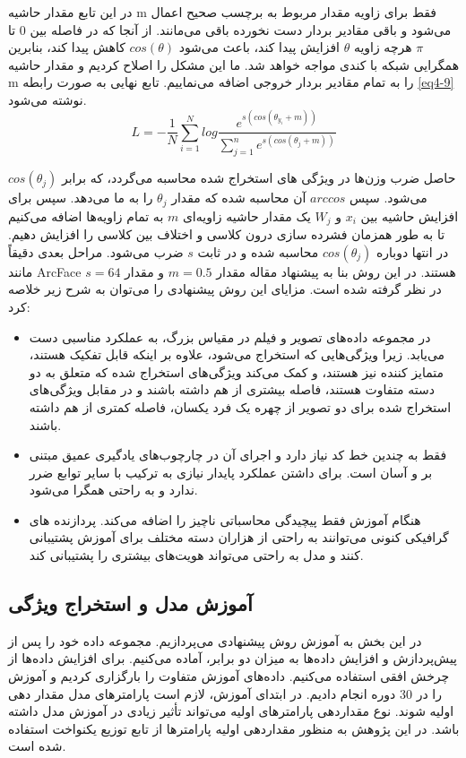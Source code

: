 \noindent 
در این تابع مقدار حاشیه m فقط برای زاویه مقدار مربوط به برچسب صحیح اعمال می‌شود و باقی مقادیر بردار دست نخورده باقی می‌مانند. از آنجا که در فاصله بین 0 تا $\pi$ هرچه زاویه $\theta$ افزایش پیدا کند، باعث می‌شود $cos(\theta)$ کاهش پیدا کند، بنابرین همگرایی شبکه با کندی مواجه خواهد شد. ما این مشکل را اصلاح کردیم و مقدار حاشیه m را به تمام مقادیر بردار خروجی اضافه می‌نماییم. تابع نهایی به صورت رابطه \ref{eq4-9} نوشته می‌شود.
\begin{equation}
L = - \frac{1}{N} \sum_{i=1}^{N} log \frac{e^{s(cos(\theta_{y_i}+m))}}{\sum_{j=1}^{n} e^{s(cos(\theta_j + m))}}
\label{eq4-9}
\end{equation}

\noindent 
حاصل ضرب وزن‌‌ها در ویژگی های استخراج شده محاسبه می‌گردد، که برابر $cos(\theta_j)$ می‌شود‌‌. سپس $arccos$ آن محاسبه شده که مقدار $\theta_j$ را به ما می‌دهد. سپس برای افزایش حاشیه بین $x_i$ و $W_j$ یک مقدار حاشیه زاویه‌ای $m$ به تمام زاویه‌ها اضافه می‌کنیم‌ تا به طور همزمان فشرده سازی درون کلاسی و اختلاف بین کلاسی را افزایش دهیم. در انتها دوباره $cos(\theta_j)$ محاسبه شده و در ثابت $s$ ضرب می‌شود.  مراحل بعدی دقیقاً مانند ArcFace هستند. در این روش بنا به پیشنهاد مقاله \cite{deng2019arcface} مقدار $m=0.5$ و مقدار $s=64$ در نظر گرفته شده است. مزایای این روش پیشنهادی را می‌توان به شرح زیر خلاصه کرد:

\begin{itemize}
 \item
در مجموعه داده‌های تصویر و فیلم در مقیاس بزرگ‌، به عملکرد مناسبی دست می‌یابد. زیرا ویژگی‌هایی که استخراج ‌می‌شود، علاوه بر اینکه قابل تفکیک  هستند، متمایز کننده  نیز هستند، و کمک می‌کند ویژگی‌های استخراج شده که متعلق به دو دسته متفاوت هستند، فاصله بیشتری از هم داشته باشند و در مقابل ویژگی‌های استخراج شده برای دو تصویر از چهره یک فرد یکسان، فاصله کمتری از هم داشته باشند.
 \item
فقط به چندین خط کد نیاز دارد و اجرای آن در چارچوب‌های  یادگیری عمیق مبتنی بر  و  آسان است. برای داشتن عملکرد پایدار نیازی به ترکیب با سایر توابع ضرر ندارد و به راحتی همگرا می‌شود.
 \item
هنگام آموزش فقط پیچیدگی محاسباتی ناچیز را اضافه می‌کند. پردازنده های گرافیکی کنونی می‌توانند به راحتی از هزاران دسته مختلف برای آموزش پشتیبانی کنند و مدل به راحتی می‌تواند هویت‌های بیشتری را پشتیبانی کند.
\end{itemize} 

\subsection{آموزش مدل و استخراج ویژگی}
در این بخش به آموزش روش پیشنهادی می‌پردازیم. مجموعه داده خود را پس از پیش‌پردازش و افزایش‌ داده‌ها  به میزان دو برابر، آماده می‌کنیم. برای افزایش داده‌ها از چرخش افقی  استفاده می‌کنیم. داده‌های آموزش متفاوت را بارگزاری کردیم و آموزش را در 30 دوره  انجام دادیم. در ابتدای آموزش، لازم است پارامترهای مدل مقدار دهی اولیه شوند. نوع مقداردهی پارامترهای اولیه می‌تواند تأثیر زیادی در آموزش مدل داشته باشد. در این پژوهش به منظور مقداردهی اولیه پارامترها از تابع توزیع یكنواخت استفاده شده است. 

